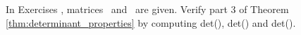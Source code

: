 {\noin In Exercises }
{, matrices \tta\ and \ttb\ are given. Verify part 3 of Theorem \ref{thm:determinant_properties} 
by computing det(\tta), det(\ttb) and det(\tta\ttb).}
